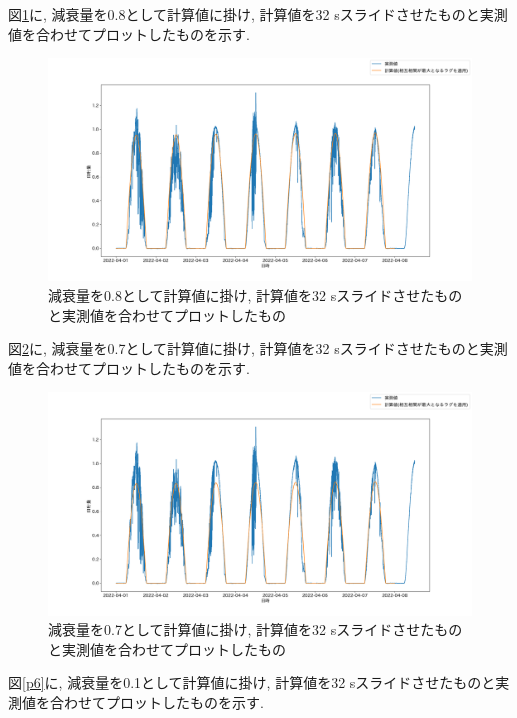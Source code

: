 \documentclass[a4j,12pt,]{jarticle}
\begin{document}
図\ref{p4}に, 減衰量を0.8として計算値に掛け, 計算値を32 \si{\second}スライドさせたものと実測値を合わせてプロットしたものを示す.

\begin{figure}[H]
  \begin{center}
    \includegraphics[width=160mm]{0.8.png}
    \caption{減衰量を0.8として計算値に掛け, 計算値を32 \si{\second}スライドさせたものと実測値を合わせてプロットしたもの}
    \label{p4}
  \end{center}
\end{figure}

図\ref{p5}に, 減衰量を0.7として計算値に掛け, 計算値を32 \si{\second}スライドさせたものと実測値を合わせてプロットしたものを示す.

\begin{figure}[H]
  \begin{center}
    \includegraphics[width=160mm]{0.7.png}
    \caption{減衰量を0.7として計算値に掛け, 計算値を32 \si{\second}スライドさせたものと実測値を合わせてプロットしたもの}
    \label{p5}
  \end{center}
\end{figure}

図\ref{p6}に, 減衰量を0.1として計算値に掛け, 計算値を32 \si{\second}スライドさせたものと実測値を合わせてプロットしたものを示す.
\end{document}
